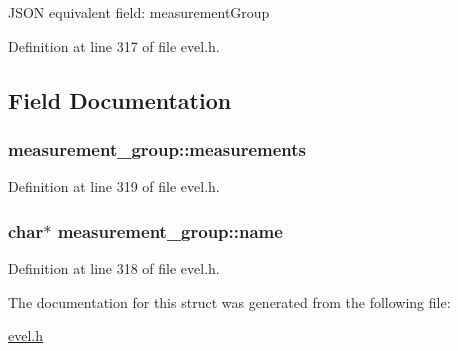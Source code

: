 J\+S\+O\+N equivalent field\+: measurement\+Group 

Definition at line 317 of file evel.\+h.



\subsection{Field Documentation}
\hypertarget{structmeasurement__group_a069f918991b814c3460b041253ad1cfa}{}
\subsubsection[{measurements}]{ measurement\+\_\+group\+::measurements}\label{structmeasurement__group_a069f918991b814c3460b041253ad1cfa}


Definition at line 319 of file evel.\+h.

\hypertarget{structmeasurement__group_a6ee37d1bc7453dad72b3da1a77c664bd}{}
\subsubsection[{name}]{\setlength{\rightskip}{0pt plus 5cm}char$\ast$ measurement\+\_\+group\+::name}\label{structmeasurement__group_a6ee37d1bc7453dad72b3da1a77c664bd}


Definition at line 318 of file evel.\+h.



The documentation for this struct was generated from the following file\+:\begin{DoxyCompactItemize}
\item 
\hyperlink{evel_8h}{evel.\+h}\end{DoxyCompactItemize}
